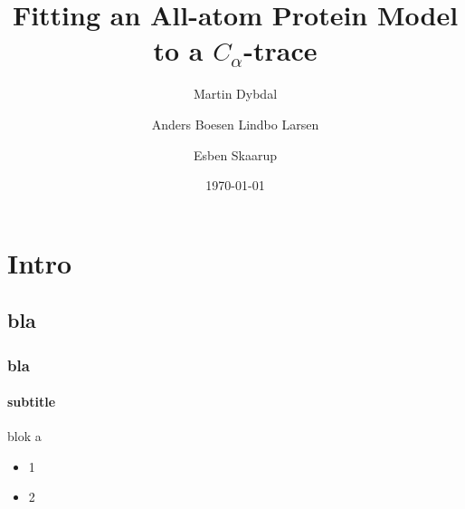 \documentclass{beamer}
\title{Fitting an All-atom Protein Model to a $C_{\alpha}$-trace}
\subtitle{}
\author{Martin Dybdal \and Anders Boesen Lindbo Larsen \and Esben Skaarup}
\institute{\textrm{Datalogisk Institut, Københavns Universitet}}
\date{\today}
\begin{document}
\frame{\titlepage}


\section{Intro}
\subsection{bla}
\begin{frame}[t, fragile]
  \frametitle{bla} 
  \framesubtitle{subtitle}

  \begin{block}{blok}
    a
  \end{block}

  \pause

  \begin{itemize}
    \item 1
    \item 2
  \end{itemize}

 
\end{frame}
\end{document}
